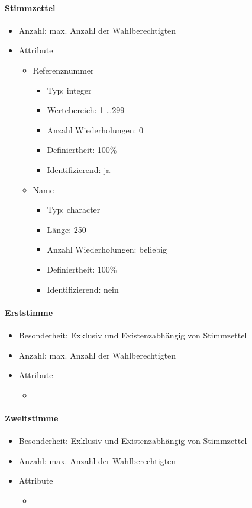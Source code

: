 \documentclass[a4paper]{article}
\begin{document}
\paragraph{Stimmzettel}
\begin{itemize}
\item Anzahl: max. Anzahl der Wahlberechtigten
\item Attribute
	\begin{itemize}
	\item Referenznummer
		\begin{itemize}
		\item Typ: integer
		\item Wertebereich: 1 \ldots 299
		\item Anzahl Wiederholungen: 0
		\item Definiertheit: 100\%
		\item Identifizierend: ja
		\end{itemize}
	\item Name
		\begin{itemize}
		\item Typ: character
		\item Länge: 250
		\item Anzahl Wiederholungen: beliebig
		\item Definiertheit: 100\%
		\item Identifizierend: nein
		\end{itemize}
	\end{itemize}
\end{itemize}

\paragraph{Erststimme}
\begin{itemize}
\item Besonderheit: Exklusiv und Existenzabhängig von Stimmzettel
\item Anzahl: max. Anzahl der Wahlberechtigten
\item Attribute
	\begin{itemize}
	\item 
	\end{itemize}
\end{itemize}

\paragraph{Zweitstimme}
\begin{itemize}
\item Besonderheit: Exklusiv und Existenzabhängig von Stimmzettel
\item Anzahl: max. Anzahl der Wahlberechtigten
\item Attribute
	\begin{itemize}
	\item 
	\end{itemize}
\end{itemize}
\end{document}
